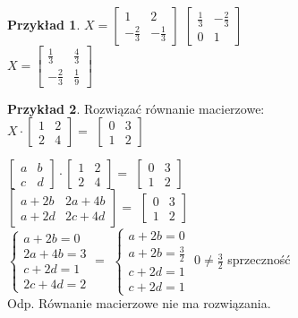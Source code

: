 \documentclass{article}
\theoremstyle{definition}
\theoremstyle{definition}
\theoremstyle{definition}
\newtheorem{pk}{Przykład}[subsection]
\theoremstyle{definition}
\begin{document}
\begin{pk}
$X=\begin{bmatrix}
    1 & 2 \\
    -\frac{2}{3} & -\frac{1}{3} 
    \end{bmatrix}  $
$ \begin{bmatrix}
    \frac{1}{3} & -\frac{2}{3} \\
    0 & 1 
    \end{bmatrix}  $\\

$X=\begin{bmatrix}
    \frac{1}{3} & \frac{4}{3} \\
    -\frac{2}{3} & \frac{1}{9} 
    \end{bmatrix}  $

\end{pk}
\begin{pk}
Rozwiązać równanie macierzowe:\\

$ X\cdot \begin{bmatrix}
    1 & 2 \\
    2 & 4 
    \end{bmatrix}  =$
$ \begin{bmatrix}
    0 & 3 \\
    1 & 2 
    \end{bmatrix}  $

$ \begin{bmatrix}
    a & b \\
    c & d 
    \end{bmatrix} \cdot \begin{bmatrix}
        1 & 2 \\
        2 & 4 
        \end{bmatrix}  =$
$ \begin{bmatrix}
    0 & 3 \\
    1 & 2 
    \end{bmatrix}  $\\

$ \begin{bmatrix}
    a+2b & 2a+4b \\
    a+2d & 2c+4d 
    \end{bmatrix} =$
$ \begin{bmatrix}
    0 & 3 \\
    1 & 2 
    \end{bmatrix}  $\\

$\begin{cases}
    a+2b=0\\
    2a+4b=3\\
    c+2d=1\\
    2c+4d=2
\end{cases}=$
$\begin{cases}
    a+2b=0\\
    a+2b=\frac{3}{2}\\
    c+2d=1\\
    c+2d=1
\end{cases}$
$0\neq \frac{3}{2}$ sprzeczność\\
Odp. Równanie macierzowe nie ma rozwiązania.
\end{pk}
\end{document}
